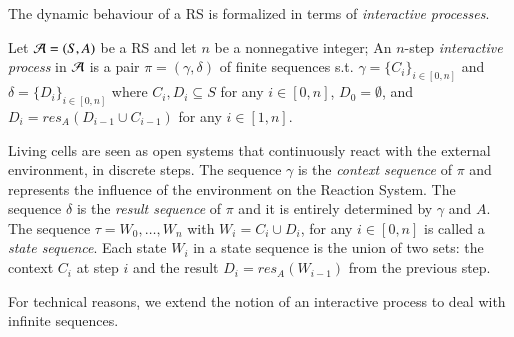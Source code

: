 The dynamic behaviour of a RS is formalized in terms of 
{\em interactive processes}.


\begin{definition}
Let ${\cal A} = (S, A)$ be a RS and let $n$
be a nonnegative integer;   
An $n$-step
\emph{interactive process} in ${\cal A}$ is a pair $\pi = (\gamma, \delta)$ of 
finite sequences s.t.
%
$ \gamma=\{C_i\}_{i\in[0,n]}$  and $\delta=\{D_i\}_{i\in[0,n]} $
where 
$ C_{i}, D_{i}  \subseteq S$ for any $i\in[0,n]$, $D_0 = \emptyset$, and 
$D_i =  \mathit{res}_{A}(D_{i-1} \cup C_{i-1})$ for any $i \in [1,n]$.
\end{definition}

Living cells are seen as open systems that continuously react with 
the external environment, in discrete steps. 
The sequence $\gamma$ is the {\em context sequence} of $\pi$ and 
represents the influence of the environment on the Reaction System.
The sequence $\delta$ is
the {\em result sequence} of $\pi$ and it is entirely determined by $\gamma$ and $A$.
%
The sequence $\tau = W_{0}, \ldots, W_{n}$ with $W_{i} = C_{i} \cup D_{i}$, 
for any $i \in [0, n]$
is called a \emph{state sequence}.
%
Each state $W_{i}$ in a state sequence
is the union of two sets: the context $C_{i}$
at step $i$ and the result $D_i=\mathit{res}_{A}(W_{i-1})$ from the previous step.

%
%


For technical reasons, we extend the notion of an interactive process to deal with 
infinite sequences.

